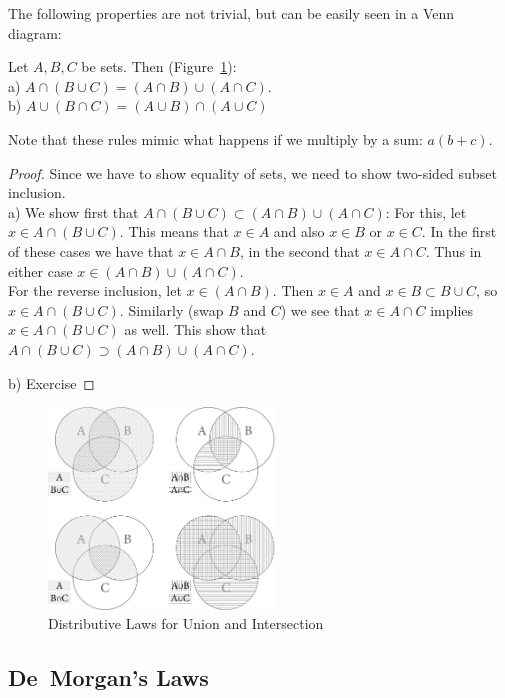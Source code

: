 The following properties are not trivial, but can be easily seen in a Venn
diagram:
\begin{thm}
Let $A,B,C$ be sets. Then (Figure~\ref{figvenndist}):\\
a) $A\cap (B\cup C)=(A\cap B)\cup(A\cap C)$.\\
b) $A\cup (B\cap C)=(A\cup B)\cap(A\cup C)$
\end{thm}
Note that these rules mimic what happens if we multiply by a sum: $a(b+c)$.
\begin{proof}
Since we have to show equality of sets, we need to show two-sided subset
inclusion.\\
a) We show first that $A\cap (B\cup C)\subset (A\cap B)\cup(A\cap C)$: For this,
let $x\in A\cap (B\cup C)$. This means that $x\in A$ and also $x\in B$ or
$x\in C$. In the first of these cases we have that $x\in A\cap B$, in the
second that $x\in A\cap C$. Thus in either case $x\in (A\cap B)\cup (A\cap
C)$. \\
For the reverse inclusion,
let $x\in (A\cap B)$. Then $x\in A$ and $x\in B\subset B\cup C$, so $x\in
A\cap (B\cup C)$. Similarly (swap $B$ and $C$) we see that $x\in A\cap C$
implies $x\in A\cap (B\cup C)$ as well. This show that
$A\cap (B\cup C)\supset (A\cap B)\cup(A\cap C)$.

b) Exercise
\end{proof}

\begin{figure}[t]
\begin{center}
\includegraphics[width=6cm]{pic/VennDistributiveLaws.pdf}
\end{center}
\caption{Distributive Laws for Union and Intersection}
\label{figvenndist}
\end{figure}

\subsection{De~Morgan's Laws}
\label{demorganlaws}


